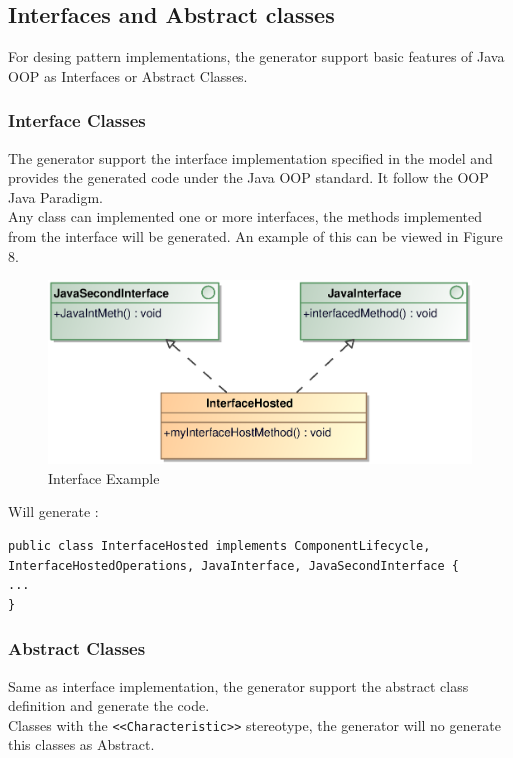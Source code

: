 \newpage

\subsection{Interfaces and Abstract classes}
For desing pattern implementations, the generator support basic features of
Java OOP as Interfaces or Abstract Classes.
\subsubsection{Interface Classes}
The generator support the interface implementation specified in the model and
provides the generated code under the Java OOP standard. It follow the OOP Java
Paradigm.\\
Any class can implemented one or more interfaces, the methods implemented from
the interface will be generated.
An example of this can be viewed in Figure 8.
\begin{figure}[h!t]
\begin{center}
\includegraphics[scale=0.6]{images/interface}
\caption{\label{fig:vs_diag}Interface Example}
\end{center}
\end{figure}

Will generate :
\begin{verbatim}
public class InterfaceHosted implements ComponentLifecycle,
InterfaceHostedOperations, JavaInterface, JavaSecondInterface {
...
}
\end{verbatim}

\subsubsection{Abstract Classes}
Same as interface implementation, the generator support the abstract class
definition and generate the code.\\
Classes with the \verb+<<Characteristic>>+ stereotype, the generator will no
generate this classes as Abstract.

